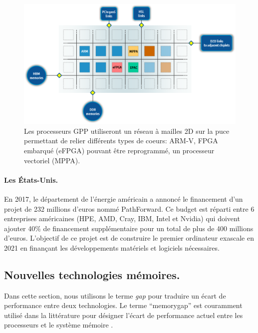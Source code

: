     \begin{figure}
        \center
        \includegraphics[width=14cm]{images/edl_epi_processor.png}
        \caption{\label{fig:edl_epi_processor} Les processeurs GPP utiliseront un réseau à mailles 2D sur la puce permettant de relier différents types de coeurs: ARM-V, FPGA embarqué (eFPGA) pouvant être reprogrammé, un processeur vectoriel (MPPA).}
    \end{figure}
    
    
    \paragraph{Les États-Unis.}
    En 2017, le département de l'énergie américain a annoncé le financement d'un projet de 232 millions d'euros nommé PathForward. Ce budget est réparti entre 6 entreprises américaines (HPE, AMD, Cray, IBM, Intel et Nvidia) qui doivent ajouter 40\% de financement supplémentaire pour un total de plus de 400 millions d'euros. L'objectif de ce projet est de construire le premier ordinateur \gls{exascale} en 2021 en finançant les développements matériels et logiciels nécessaires.


        


\subsection{Nouvelles technologies mémoires.}\label{sec:oppo_new_memory}

     
    Dans cette section, nous utilisons le terme \textit{gap} pour traduire un écart de performance entre deux technologies. Le terme ``\gls{memorygap}'' est couramment utilisé dans la littérature pour désigner l'écart de performance actuel entre les processeurs et le système mémoire \cite{Wilkes2001}.


